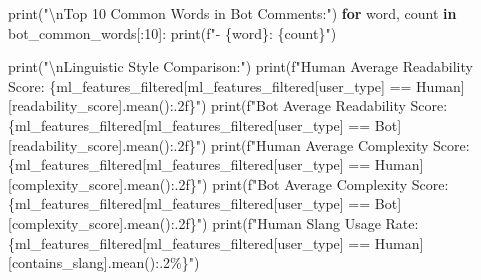\documentclass[
  12pt,
  letterpaper,
  DIV=11,
  numbers=noendperiod]{scrartcl}
\newenvironment{Shaded}{\begin{snugshade}}{\end{snugshade}}
\newcommand{\BuiltInTok}[1]{\textcolor[rgb]{0.00,0.23,0.31}{#1}}
\newcommand{\CharTok}[1]{\textcolor[rgb]{0.13,0.47,0.30}{#1}}
\newcommand{\ControlFlowTok}[1]{\textcolor[rgb]{0.00,0.23,0.31}{\textbf{#1}}}
\newcommand{\DecValTok}[1]{\textcolor[rgb]{0.68,0.00,0.00}{#1}}
\newcommand{\KeywordTok}[1]{\textcolor[rgb]{0.00,0.23,0.31}{\textbf{#1}}}
\newcommand{\NormalTok}[1]{\textcolor[rgb]{0.00,0.23,0.31}{#1}}
\newcommand{\OperatorTok}[1]{\textcolor[rgb]{0.37,0.37,0.37}{#1}}
\newcommand{\SpecialCharTok}[1]{\textcolor[rgb]{0.37,0.37,0.37}{#1}}
\newcommand{\SpecialStringTok}[1]{\textcolor[rgb]{0.13,0.47,0.30}{#1}}
\newcommand{\StringTok}[1]{\textcolor[rgb]{0.13,0.47,0.30}{#1}}
\begin{document}
\begin{Shaded}
\begin{Highlighting}[]
\BuiltInTok{print}\NormalTok{(}\StringTok{"}\CharTok{\textbackslash{}n}\StringTok{Top 10 Common Words in Bot Comments:"}\NormalTok{)}
\ControlFlowTok{for}\NormalTok{ word, count }\KeywordTok{in}\NormalTok{ bot\_common\_words[:}\DecValTok{10}\NormalTok{]:}
    \BuiltInTok{print}\NormalTok{(}\SpecialStringTok{f"{-} }\SpecialCharTok{\{}\NormalTok{word}\SpecialCharTok{\}}\SpecialStringTok{: }\SpecialCharTok{\{}\NormalTok{count}\SpecialCharTok{\}}\SpecialStringTok{"}\NormalTok{)}

\BuiltInTok{print}\NormalTok{(}\StringTok{"}\CharTok{\textbackslash{}n}\StringTok{Linguistic Style Comparison:"}\NormalTok{)}
\BuiltInTok{print}\NormalTok{(}\SpecialStringTok{f"Human Average Readability Score: }\SpecialCharTok{\{}\NormalTok{ml\_features\_filtered[ml\_features\_filtered[}\StringTok{\textquotesingle{}user\_type\textquotesingle{}}\NormalTok{] }\OperatorTok{==} \StringTok{\textquotesingle{}Human\textquotesingle{}}\NormalTok{][}\StringTok{\textquotesingle{}readability\_score\textquotesingle{}}\NormalTok{]}\SpecialCharTok{.}\NormalTok{mean()}\SpecialCharTok{:.2f\}}\SpecialStringTok{"}\NormalTok{)}
\BuiltInTok{print}\NormalTok{(}\SpecialStringTok{f"Bot Average Readability Score: }\SpecialCharTok{\{}\NormalTok{ml\_features\_filtered[ml\_features\_filtered[}\StringTok{\textquotesingle{}user\_type\textquotesingle{}}\NormalTok{] }\OperatorTok{==} \StringTok{\textquotesingle{}Bot\textquotesingle{}}\NormalTok{][}\StringTok{\textquotesingle{}readability\_score\textquotesingle{}}\NormalTok{]}\SpecialCharTok{.}\NormalTok{mean()}\SpecialCharTok{:.2f\}}\SpecialStringTok{"}\NormalTok{)}
\BuiltInTok{print}\NormalTok{(}\SpecialStringTok{f"Human Average Complexity Score: }\SpecialCharTok{\{}\NormalTok{ml\_features\_filtered[ml\_features\_filtered[}\StringTok{\textquotesingle{}user\_type\textquotesingle{}}\NormalTok{] }\OperatorTok{==} \StringTok{\textquotesingle{}Human\textquotesingle{}}\NormalTok{][}\StringTok{\textquotesingle{}complexity\_score\textquotesingle{}}\NormalTok{]}\SpecialCharTok{.}\NormalTok{mean()}\SpecialCharTok{:.2f\}}\SpecialStringTok{"}\NormalTok{)}
\BuiltInTok{print}\NormalTok{(}\SpecialStringTok{f"Bot Average Complexity Score: }\SpecialCharTok{\{}\NormalTok{ml\_features\_filtered[ml\_features\_filtered[}\StringTok{\textquotesingle{}user\_type\textquotesingle{}}\NormalTok{] }\OperatorTok{==} \StringTok{\textquotesingle{}Bot\textquotesingle{}}\NormalTok{][}\StringTok{\textquotesingle{}complexity\_score\textquotesingle{}}\NormalTok{]}\SpecialCharTok{.}\NormalTok{mean()}\SpecialCharTok{:.2f\}}\SpecialStringTok{"}\NormalTok{)}
\BuiltInTok{print}\NormalTok{(}\SpecialStringTok{f"Human Slang Usage Rate: }\SpecialCharTok{\{}\NormalTok{ml\_features\_filtered[ml\_features\_filtered[}\StringTok{\textquotesingle{}user\_type\textquotesingle{}}\NormalTok{] }\OperatorTok{==} \StringTok{\textquotesingle{}Human\textquotesingle{}}\NormalTok{][}\StringTok{\textquotesingle{}contains\_slang\textquotesingle{}}\NormalTok{]}\SpecialCharTok{.}\NormalTok{mean()}\SpecialCharTok{:.2\%\}}\SpecialStringTok{"}\NormalTok{)}

\end{Highlighting}
\end{Shaded}
\end{document}
